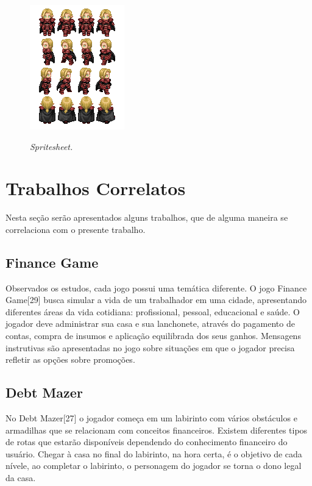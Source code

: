         \begin{figure}
            \centering
            \caption{\textit{Spritesheet.}}
            \includegraphics[scale=1.8]{Textuais/Pictures/Picture5.png}
            \label{fig:figure-5}
        \end{figure}


    \section{Trabalhos Correlatos}

        Nesta seção serão apresentados alguns trabalhos, que de alguma maneira se correlaciona com o presente trabalho.

        \subsection{Finance Game}
            Observados os estudos, cada jogo possui uma temática diferente. O jogo Finance Game[29] busca simular a vida
            de um trabalhador em uma cidade, apresentando diferentes áreas da vida cotidiana: profissional, pessoal,
            educacional e saúde. O jogador deve administrar sua casa e sua lanchonete, através do pagamento de contas,
            compra de insumos e aplicação equilibrada  dos  seus  ganhos.  Mensagens  instrutivas  são apresentadas no
            jogo sobre situações em que o jogador precisa refletir as opções sobre promoções.

        \subsection{Debt Mazer}
            No Debt Mazer[27] o jogador começa em um labirinto com vários obstáculos e armadilhas que se relacionam com
            conceitos financeiros. Existem diferentes tipos de rotas que estarão disponíveis dependendo do conhecimento
            financeiro do usuário. Chegar à casa no final do labirinto, na hora certa, é o objetivo de cada nívele, ao
            completar o labirinto, o personagem do jogador se torna o dono legal da casa.

